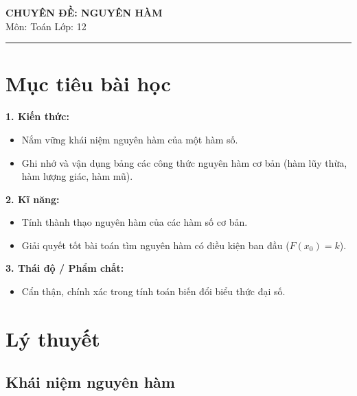 \documentclass[12pt]{article}
\begin{document}
	
	\begin{center}
		{\LARGE \textbf{CHUYÊN ĐỀ: NGUYÊN HÀM}}\\[4pt]
		{\large Môn: Toán \quad Lớp: 12}
	\end{center}
	\vspace{4mm}
	\hrule
	\vspace{4mm}
	
	\section*{Mục tiêu bài học}
	
	\textbf{1. Kiến thức:}
	\begin{itemize}
		\item Nắm vững khái niệm nguyên hàm của một hàm số.
		\item Ghi nhớ và vận dụng bảng các công thức nguyên hàm cơ bản (hàm lũy thừa, hàm lượng giác, hàm mũ).
	\end{itemize}
	
	\noindent \textbf{2. Kĩ năng:}
	\begin{itemize}
		\item Tính thành thạo nguyên hàm của các hàm số cơ bản.
		\item Giải quyết tốt bài toán tìm nguyên hàm có điều kiện ban đầu ($F(x_0) = k$).
	\end{itemize}
	
	\noindent \textbf{3. Thái độ / Phẩm chất:}
	\begin{itemize}
		\item Cẩn thận, chính xác trong tính toán biến đổi biểu thức đại số.
	\end{itemize}
	
	\newpage
	
	\setcounter{tocdepth}{2}
	\tableofcontents
	\newpage
	
	\section{Lý thuyết}
	
	\subsection{Khái niệm nguyên hàm}
	
\end{document}

